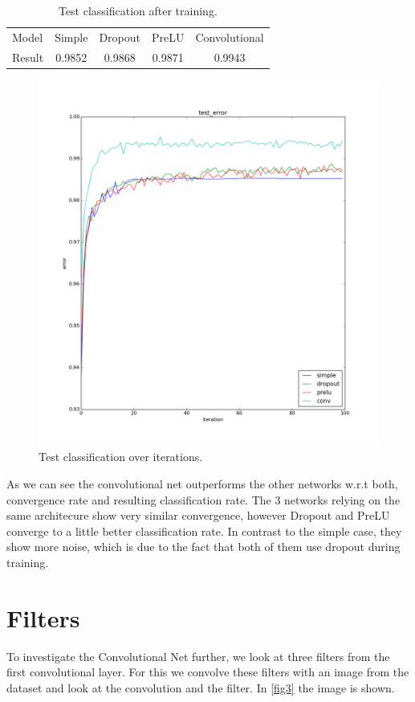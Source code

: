 \documentclass{article}
\begin{document}
\begin{table}[h]
	\centering
	\begin{tabular}{l c c c C}
        Model	&	Simple	& Dropout & PreLU   & Convolutional	\\
        Result	&	0.9852	& 0.9868  & 0.9871  &	0.9943      \\
	\end{tabular}
	\caption{Test classification after training.}
	\label{tab1}
\end{table}

\begin{figure}[h]
	\centering
	\includegraphics[width = .8\textwidth]{graphics/compare_nets.png}
	\caption{Test classification over iterations.}
	\label{fig2}
\end{figure}

As we can see the convolutional net outperforms the other networks w.r.t both, convergence rate and resulting classification rate. 
The 3 networks relying on the same architecure show very similar convergence, however Dropout and PreLU converge to a little better classification rate.
In contrast to the simple case, they show more noise, which is due to the fact that both of them use dropout during training.

\section{Filters}

To investigate the Convolutional Net further, we look at three filters from the first convolutional layer.
For this we convolve these filters with an image from the dataset and look at the convolution and the filter.
In \autoref{fig3} the image is shown.
\end{document}
